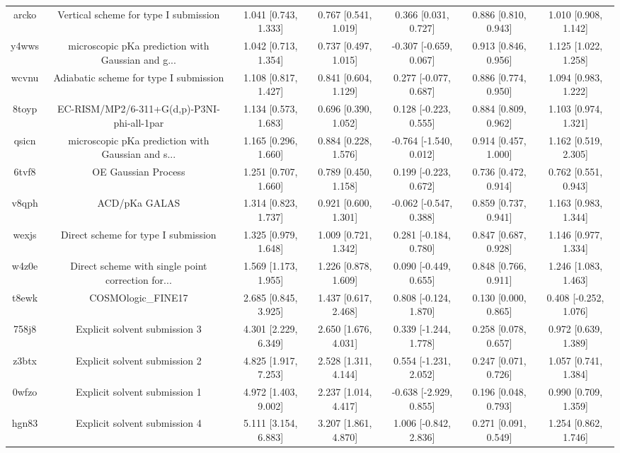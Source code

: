 \documentclass{article}
\begin{document}
\begin{center}
\begin{longtable}{|ccccccc|}
 arcko &              Vertical scheme for type I submission &  1.041 [0.743, 1.333] &  0.767 [0.541, 1.019] &     0.366 [0.031, 0.727] &  0.886 [0.810, 0.943] &   1.010 [0.908, 1.142] \\
 y4wws &  microscopic pKa prediction with Gaussian and g... &  1.042 [0.713, 1.354] &  0.737 [0.497, 1.015] &   -0.307 [-0.659, 0.067] &  0.913 [0.846, 0.956] &   1.125 [1.022, 1.258] \\
 wcvnu &             Adiabatic scheme for type I submission &  1.108 [0.817, 1.427] &  0.841 [0.604, 1.129] &    0.277 [-0.077, 0.687] &  0.886 [0.774, 0.950] &   1.094 [0.983, 1.222] \\
 8toyp &         EC-RISM/MP2/6-311+G(d,p)-P3NI-phi-all-1par &  1.134 [0.573, 1.683] &  0.696 [0.390, 1.052] &    0.128 [-0.223, 0.555] &  0.884 [0.809, 0.962] &   1.103 [0.974, 1.321] \\
 qsicn &  microscopic pKa prediction with Gaussian and s... &  1.165 [0.296, 1.660] &  0.884 [0.228, 1.576] &   -0.764 [-1.540, 0.012] &  0.914 [0.457, 1.000] &   1.162 [0.519, 2.305] \\
 6tvf8 &                                OE Gaussian Process &  1.251 [0.707, 1.660] &  0.789 [0.450, 1.158] &    0.199 [-0.223, 0.672] &  0.736 [0.472, 0.914] &   0.762 [0.551, 0.943] \\
 v8qph &                                      ACD/pKa GALAS &  1.314 [0.823, 1.737] &  0.921 [0.600, 1.301] &   -0.062 [-0.547, 0.388] &  0.859 [0.737, 0.941] &   1.163 [0.983, 1.344] \\
 wexjs &                Direct scheme for type I submission &  1.325 [0.979, 1.648] &  1.009 [0.721, 1.342] &    0.281 [-0.184, 0.780] &  0.847 [0.687, 0.928] &   1.146 [0.977, 1.334] \\
 w4z0e &  Direct scheme with single point correction for... &  1.569 [1.173, 1.955] &  1.226 [0.878, 1.609] &    0.090 [-0.449, 0.655] &  0.848 [0.766, 0.911] &   1.246 [1.083, 1.463] \\
 t8ewk &                                 COSMOlogic\_FINE17 &  2.685 [0.845, 3.925] &  1.437 [0.617, 2.468] &    0.808 [-0.124, 1.870] &  0.130 [0.000, 0.865] &  0.408 [-0.252, 1.076] \\
 758j8 &                      Explicit solvent submission 3 &  4.301 [2.229, 6.349] &  2.650 [1.676, 4.031] &    0.339 [-1.244, 1.778] &  0.258 [0.078, 0.657] &   0.972 [0.639, 1.389] \\
 z3btx &                      Explicit solvent submission 2 &  4.825 [1.917, 7.253] &  2.528 [1.311, 4.144] &    0.554 [-1.231, 2.052] &  0.247 [0.071, 0.726] &   1.057 [0.741, 1.384] \\
 0wfzo &                      Explicit solvent submission 1 &  4.972 [1.403, 9.002] &  2.237 [1.014, 4.417] &   -0.638 [-2.929, 0.855] &  0.196 [0.048, 0.793] &   0.990 [0.709, 1.359] \\
 hgn83 &                      Explicit solvent submission 4 &  5.111 [3.154, 6.883] &  3.207 [1.861, 4.870] &    1.006 [-0.842, 2.836] &  0.271 [0.091, 0.549] &   1.254 [0.862, 1.746] \\
\end{longtable}
\end{center}
\end{document}
